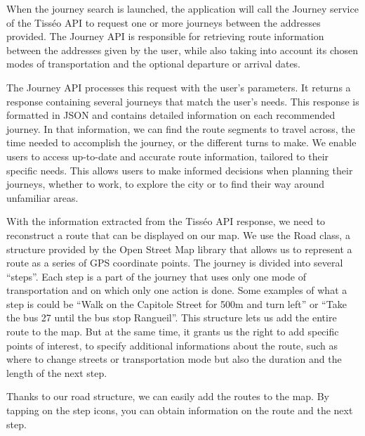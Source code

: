 When the journey search is launched, the application will call the Journey service of the Tisséo API to request one or more journeys between the addresses provided. The Journey API is responsible for retrieving route information between the addresses given by the user, while also taking into account its chosen modes of transportation and the optional departure or arrival dates.


The Journey API processes this request with the user's parameters. It returns a response containing several journeys that match the user's needs. This response is formatted in JSON and contains detailed information on each recommended journey. In that information, we can find the route segments to travel across, the time needed to accomplish the journey, or the different turns to make. We enable users to access up-to-date and accurate route information, tailored to their specific needs. This allows users to make informed decisions when planning their journeys, whether to work, to explore the city or to find their way around unfamiliar areas.


With the information extracted from the Tisséo API response, we need to reconstruct a route that can be displayed on our map. We use the Road class, a structure provided by the Open Street Map library that allows us to represent a route as a series of GPS coordinate points. The journey is divided into several “steps”. Each step is a part of the journey that uses only one mode of transportation and on which only one action is done. Some examples of what a step is could be “Walk on the Capitole Street for 500m and turn left” or “Take the bus 27 until the bus stop Rangueil”. This structure lets us add the entire route to the map. But at the same time, it grants us the right to add specific points of interest, to specify additional informations about the route, such as where to change streets or transportation mode but also the duration and the length of the next step.


Thanks to our road structure, we can easily add the routes to the map. By tapping on the step icons, you can obtain information on the route and the next step.



